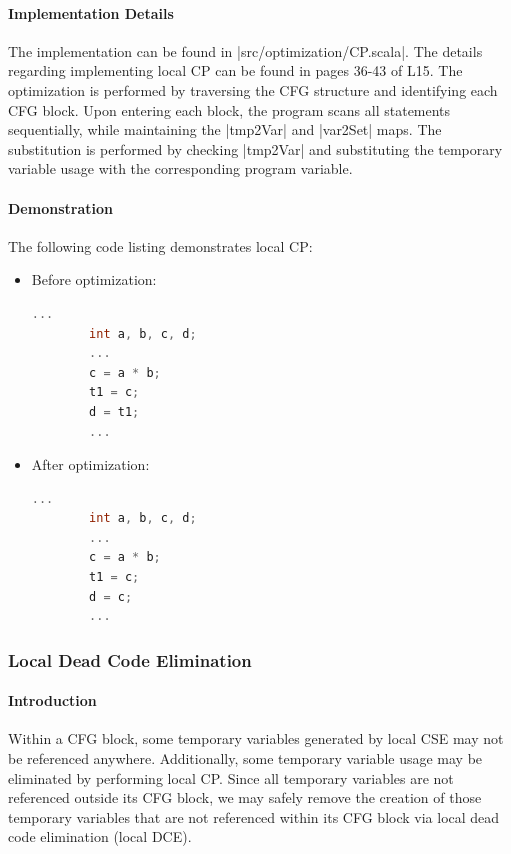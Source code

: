 \paragraph{Implementation Details}

The implementation can be found in |src/optimization/CP.scala|. The details regarding implementing local CP can be found in pages 36-43 of L15. The optimization is performed by traversing the CFG structure and identifying each CFG block. Upon entering each block, the program scans all statements sequentially, while maintaining the |tmp2Var| and |var2Set| maps. The substitution is performed by checking |tmp2Var| and substituting the temporary variable usage with the corresponding program variable.

\paragraph{Demonstration}

The following code listing demonstrates local CP:

\begin{itemize}
    \item Before optimization:
    \begin{lstlisting}[language=C]
        ...
        int a, b, c, d;
        ...
        c = a * b;
        t1 = c;
        d = t1;
        ...
    \end{lstlisting}
    \item After optimization:
    \begin{lstlisting}[language=C]
        ...
        int a, b, c, d;
        ...
        c = a * b;
        t1 = c;
        d = c;
        ...
    \end{lstlisting}
\end{itemize}

\subsubsection{Local Dead Code Elimination}

\paragraph{Introduction}

Within a CFG block, some temporary variables generated by local CSE may not be referenced anywhere. Additionally, some temporary variable usage may be eliminated by performing local CP. Since all temporary variables are not referenced outside its CFG block, we may safely remove the creation of those temporary variables that are not referenced within its CFG block via local dead code elimination (local DCE).

